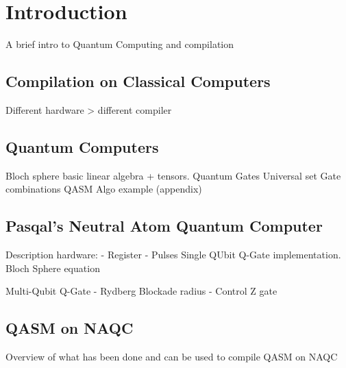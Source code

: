 \section{Introduction}
\label{sec:intro}


A brief intro to Quantum Computing and compilation
\subsection{Compilation on Classical Computers}
\label{sec:Classical Computing}
Different hardware > different compiler

\subsection{Quantum Computers}
\label{sec:QC}
Bloch sphere basic linear algebra + tensors.
Quantum Gates
Universal set
Gate combinations
QASM
Algo example (appendix)


\subsection{Pasqal's Neutral Atom Quantum Computer}
\label{sec:NAQC}
Description
hardware:
- Register 
- Pulses
Single QUbit Q-Gate implementation.
Bloch Sphere equation

Multi-Qubit Q-Gate
- Rydberg Blockade radius
- Control Z gate

\subsection{QASM on NAQC}
\label{sec:QASM_NAQC}
Overview of what has been done and can be used to compile QASM on NAQC